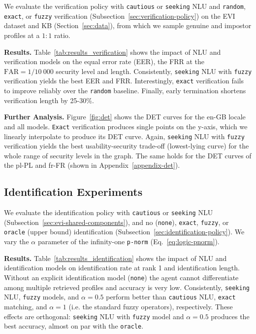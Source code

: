 \documentclass[11pt]{article}
\newcommand{\rparagraph}[1]{\vspace{1.4mm}\noindent\textbf{#1.}}
\begin{document}
{ 
We evaluate the verification policy
with \texttt{cautious} or \texttt{seeking} NLU
and \texttt{random}, \texttt{exact}, or \texttt{fuzzy}
verification (Subsection~\ref{sec:verification-policy})
on the EVI dataset and KB (Section~\ref{sec:data}),
from which we sample genuine and impostor profiles
at a $1:1$ ratio.


\rparagraph{Results}
Table~\ref{tab:results_verification} shows
the impact of NLU and verification models
on the equal error rate (EER), the FRR at the $\text{FAR}=1/10~000$ security level and length.
Consistently,
\texttt{seeking} NLU with \texttt{fuzzy} verification
yields the best EER and FRR.
Interestingly,
\texttt{exact} verification
fails to improve reliably
over the \texttt{random} baseline.
Finally, early termination shortens verification length by 25-30\%.

\rparagraph{Further Analysis} Figure~\ref{fig:det}
shows the DET curves for the en-GB locale and all models.
\texttt{Exact} verification produces single points on the y-axis,
which we linearly interpolate to produce its DET curve.
Again,
\texttt{seeking} NLU with \texttt{fuzzy} verification
yields the best usability-security trade-off (lowest-lying curve)
for the whole range of security levels in the graph.
The same holds for the DET curves of the pl-PL and fr-FR
(shown in Appendix~\ref{appendix-det}).







\subsection{Identification Experiments}
\label{sec:identification-experiments}


We evaluate the identification policy
with \texttt{cautious} or \texttt{seeking} NLU (Subsection~\ref{sec:evi-shared-components}),
and no (\texttt{none}), \texttt{exact}, \texttt{fuzzy}, or \texttt{oracle} (upper bound) identification (Subsection~\ref{sec:identification-policy}).
We vary the $\alpha$ parameter
of the infinity-one \texttt{p-norm} (Eq.~\ref{eq:logic-pnorm}).


\rparagraph{Results} Table~\ref{tab:results_identification}
shows the impact of NLU and identification models on identification rate at rank 1 and identification length.
Without an explicit identification model (\texttt{none})
the agent cannot differentiate among multiple retrieved profiles
and accuracy is very low.
Consistently,
\texttt{seeking} NLU,
\texttt{fuzzy} models,
and $\alpha=0.5$ 
perform better than
\texttt{cautious} NLU,
\texttt{exact} matching,
and $\alpha=1$ (i.e. the standard fuzzy operators), respectively.
These effects are orthogonal:
\texttt{seeking} NLU with \texttt{fuzzy} model and $\alpha=0.5$
produces the best accuracy,
almost on par with the \texttt{oracle}.


}
\end{document}
